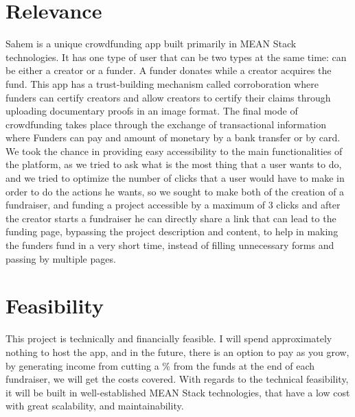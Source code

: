 \section{Relevance}
Sahem is a unique crowdfunding app built primarily in MEAN Stack technologies. It has one type of user that can be two types at the same time: can be either a creator or a funder. A funder donates while a creator acquires the fund. This app has a trust-building mechanism called corroboration where funders can certify creators and allow creators to certify their claims through uploading documentary proofs in an image format. The final mode of crowdfunding takes place through the exchange of transactional information where Funders can pay and amount of monetary by a bank transfer or by card.
We took the chance in providing easy accessibility to the main functionalities of the platform, as we tried to ask what is the most thing that a user wants to do, and we tried to optimize the number of clicks that a user would have to make in order to do the actions he wants, so we sought to make both of the creation of a fundraiser, and funding a project accessible by a maximum of 3 clicks and after the creator starts a fundraiser he can directly share a link that can lead to the funding page, bypassing the project description and content, to help in making the funders fund in a very short time, instead of filling unnecessary forms and passing by multiple pages.
\section{Feasibility}
This project is technically and financially feasible. I will spend approximately nothing to host the app, and in the future, there is an option to pay as you grow, by generating income from cutting a \% from the funds at the end of each fundraiser, we will get the costs covered. With regards to the technical feasibility, it will be built in well-established MEAN Stack technologies, that have a low cost with great scalability, and maintainability.

